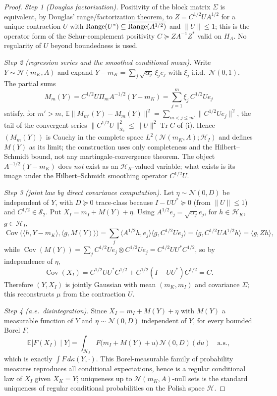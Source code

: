 \begin{proof}
\emph{Step 1 (Douglas factorization).}  Positivity of the block matrix
$\Sigma$ is equivalent, by Douglas' range/factorization theorem, to
$Z=C^{1/2}UA^{1/2}$ for a unique contraction $U$ with
$\operatorname{Range}(U^*)\subseteq\overline{\operatorname{Range}(A^{1/2})}$ and $\|U\|\le1$; this is the
operator form of the Schur-complement positivity $C\succeq ZA^{-1}Z^*$ valid on
$H_A$.  No regularity of $U$ beyond boundedness is used.

\emph{Step 2 (regression series and the smoothed conditional mean).}  Write
$Y\sim\mathcal{N}(m_K,A)$ and expand $Y-m_K=\sum_j\sqrt{\alpha_j}\,\xi_je_j$ with
$\xi_j$ i.i.d.\ $\mathcal{N}(0,1)$.  The partial sums
\[
  M_m(Y)=C^{1/2}U\Pi_mA^{-1/2}(Y-m_K)=\sum_{j=1}^m\xi_j\,C^{1/2}Ue_j
\]
satisfy, for $m'>m$,
$\mathbb{E}\|M_{m'}(Y)-M_m(Y)\|^2=\sum_{m<j\le m'}\|C^{1/2}Ue_j\|^2$, the tail of
the convergent series $\|C^{1/2}U\|_{\mathcal{S}_2}^2\le\|U\|^2\operatorname{Tr}C$
of (i).  Hence $(M_m(Y))$ is Cauchy in the complete space
$L^2(\mathcal{N}(m_K,A);\mathcal{H}_I)$ and defines $M(Y)$ as its limit; the
construction uses only completeness and the Hilbert--Schmidt bound, not any
martingale-convergence theorem.  The object $A^{-1/2}(Y-m_K)$ does \emph{not}
exist as an $\mathcal{H}_K$-valued variable; what exists is its image under the
Hilbert--Schmidt smoothing operator $C^{1/2}U$.

\emph{Step 3 (joint law by direct covariance computation).}  Let
$\eta\sim\mathcal{N}(0,D)$ be independent of $Y$, with $D\succeq0$ trace-class
because $I-UU^*\succeq0$ (from $\|U\|\le1$) and $C^{1/2}\in\mathcal{S}_2$.  Put
$X_I=m_I+M(Y)+\eta$.  Using $A^{1/2}e_j=\sqrt{\alpha_j}e_j$, for $h\in\mathcal{H}_K$,
$g\in\mathcal{H}_I$,
\[
  \operatorname{Cov}\bigl(\langle h,Y-m_K\rangle,\langle g,M(Y)\rangle\bigr)
  =\sum_j\langle A^{1/2}h,e_j\rangle\langle g,C^{1/2}Ue_j\rangle
  =\langle g,C^{1/2}UA^{1/2}h\rangle
  =\langle g,Zh\rangle,
\]
while
$\operatorname{Cov}(M(Y))=\sum_j C^{1/2}Ue_j\otimes C^{1/2}Ue_j
=C^{1/2}UU^*C^{1/2}$, so by independence of $\eta$,
\[
  \operatorname{Cov}(X_I)
  =C^{1/2}UU^*C^{1/2}+C^{1/2}(I-UU^*)C^{1/2}=C .
\]
Therefore $(Y,X_I)$ is jointly Gaussian with mean $(m_K,m_I)$ and covariance
$\Sigma$; this reconstructs $\mu$ from the contraction $U$.

\emph{Step 4 (a.e.\ disintegration).}  Since $X_I=m_I+M(Y)+\eta$ with $M(Y)$ a
measurable function of $Y$ and $\eta\sim\mathcal{N}(0,D)$ independent of $Y$, for
every bounded Borel $F$,
\[
  \mathbb{E}\bigl[F(X_I)\mid Y\bigr]
  =\int_{\mathcal{H}_I}F\bigl(m_I+M(Y)+u\bigr)\,\mathcal{N}(0,D)(du)
  \quad\text{a.s.},
\]
which is exactly $\int F\,d\kappa(Y,\cdot)$.  This Borel-measurable family of
probability measures reproduces all conditional expectations, hence is a regular
conditional law of $X_I$ given $X_K=Y$; uniqueness up to
$\mathcal{N}(m_K,A)$-null sets is the standard uniqueness of regular conditional
probabilities on the Polish space $\mathcal{H}$.


\end{proof}
